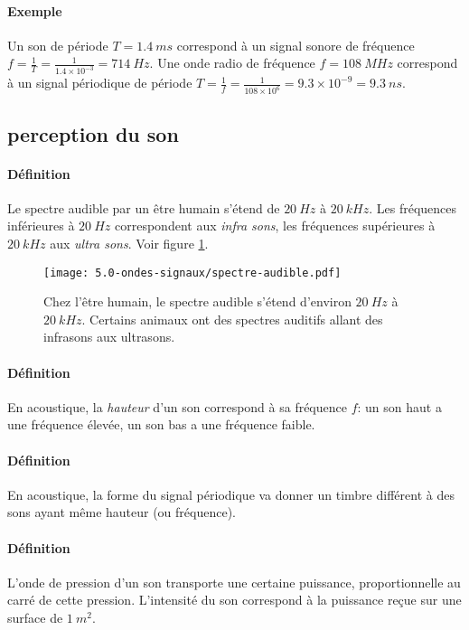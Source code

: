 \paragraph{Exemple} Un son de période $T=1.4~ms$ correspond à un signal sonore de fréquence $f=\frac{1}{T} = \frac{1}{1.4 \times 10^{-3}} = 714~Hz$. Une onde radio de fréquence $f=108~MHz$ correspond à un signal périodique de période $T= \frac{1}{f} =\frac{1}{108 \times 10^6} =9.3 \times 10^{-9} = 9.3~ns$.

\subsection{perception du son}
\paragraph{Définition} Le spectre audible par un être humain s'étend de $20~Hz$ à $20~kHz$.
Les fréquences inférieures à $20~Hz$ correspondent aux \textit{infra sons}, les fréquences supérieures à $20~kHz$ aux \textit{ultra sons}. Voir figure \ref{fig:spectre-audible}.
\begin{figure}[h!]
  \begin{center}
      \texttt{[image: 5.0-ondes-signaux/spectre-audible.pdf]}
  \end{center}
  \caption{Chez l'être humain, le spectre audible s'étend d'environ $20~Hz$ à $20~kHz$. Certains animaux ont des spectres auditifs allant des infrasons aux ultrasons.}
  \label{fig:spectre-audible}
\end{figure}

\paragraph{Définition} En acoustique, la \textit{hauteur} d'un son correspond à sa fréquence $f$: un son haut a une fréquence élevée, un son bas a une fréquence faible.

\paragraph{Définition} En acoustique, la forme du signal périodique va donner un timbre différent à des sons ayant même hauteur (ou fréquence).

\paragraph{Définition} L'onde de pression d'un son transporte une certaine puissance, proportionnelle au carré de cette pression. L'intensité du son correspond à la puissance reçue sur une surface de $1~m^2$.

